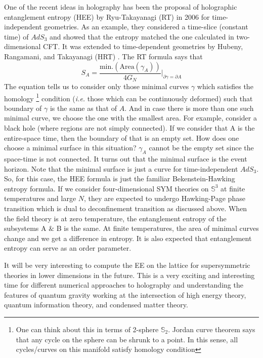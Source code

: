 One of the recent ideas in holography has been the proposal of holographic entanglement entropy (HEE) 
by Ryu-Takayanagi (RT) in 2006 for time-independent geometries. As an example, 
they considered a time-slice (constant time) of $AdS_{3}$ and showed that the entropy matched the 
one calculated in two-dimensional CFT. 
It was extended to time-dependent geometries by Hubeny, Rangamani, and Takayanagi (HRT) 
\cite{2007JHEP...07..062H}.
The RT formula says that 
\begin{equation}
S_{A} = \frac{\text{min.}(\text{Area}(\gamma_{A}))}{4G_{N}} \Bigg \vert_{\partial \gamma = \partial A} 
\end{equation} 
The equation tells us to consider only those minimal curves $\gamma$ which satisfies
the homology \footnote{One can think about this in terms of 2-sphere $\mathbb{S}_{2}$. 
Jordan curve theorem says that any cycle on the sphere can be shrunk to a point. In this 
sense, all cycles/curves on this manifold satisfy homology condition} condition (\emph{i.e.} 
those which can be continuously deformed) such that boundary of $\gamma$ is the same as 
that of $A$. And in case there is more than one such minimal curve, we choose the one with 
the smallest area. 
For example, consider a black hole (where regions are not simply connected). 
If we consider that A is the entire-space time, then the boundary of that is an empty set. 
How does one choose a minimal surface in this situation? $\gamma_{A}$ cannot be the 
empty set since the space-time is not connected. It turns out that the minimal surface is the event horizon. 
Note that the minimal surface is just a curve for time-independent $AdS_{3}$.
So, for this case, the HEE formula is just the familiar Bekenstein-Hawking entropy formula. 
If we consider four-dimensional SYM theories on $\mathbb{S}^{3}$ 
at finite temperatures and large $N$, they are expected to undergo Hawking-Page phase 
transition which is dual to deconfinement transition as discussed above. When the field 
theory is at zero temperature, the entanglement entropy of the subsystems A $\&$ B is 
the same. At finite temperatures, the area of minimal curves change and we get a difference 
in entropy. It is also expected that entanglement entropy can serve as an order parameter. 

It will be very interesting to compute the EE on the lattice for supersymmetric theories
in lower dimensions in the future. This is a very exciting and interesting time for different numerical 
approaches to holography and understanding the features of quantum gravity working at the intersection 
of high energy theory, quantum information theory, and condensed matter theory.


